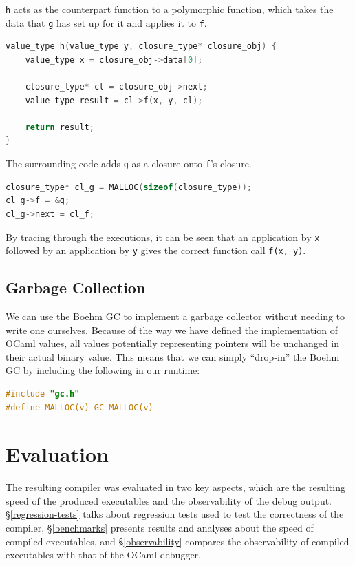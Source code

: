 \texttt{h} acts as the counterpart function to a polymorphic function, which 
takes the data that \texttt{g} has set up for it and applies it to \texttt{f}.

\begin{lstlisting}[language=C]
value_type h(value_type y, closure_type* closure_obj) {
    value_type x = closure_obj->data[0];
    
    closure_type* cl = closure_obj->next;
    value_type result = cl->f(x, y, cl);
    
    return result;
}
\end{lstlisting}

The surrounding code adds \texttt{g} as a closure onto \texttt{f}'s closure.

\begin{lstlisting}[language=C]
closure_type* cl_g = MALLOC(sizeof(closure_type));
cl_g->f = &g;
cl_g->next = cl_f;
\end{lstlisting}

By tracing through the executions, it can be seen that an application by 
\texttt{x} followed by an application by \texttt{y} gives the correct function 
call \texttt{f(x, y)}.

\section{Garbage Collection} \label{gc}

We can use the Boehm GC to implement a garbage collector without needing to
write one ourselves. Because of the way we have defined the implementation of
OCaml values, all values potentially representing pointers will be unchanged in
their actual binary value. This means that we can simply ``drop-in'' the Boehm
GC by including the following in our runtime:

\begin{lstlisting}[language=C]
#include "gc.h"
#define MALLOC(v) GC_MALLOC(v)
\end{lstlisting}

\chapter{Evaluation}

The resulting compiler was evaluated in two key aspects, which are the 
resulting speed of the produced executables and the observability of the debug 
output. \S\ref{regression-tests} talks about regression tests used to test the
correctness of the compiler, \S\ref{benchmarks} presents results and analyses
about the speed of compiled executables, and \S\ref{observability} compares the
observability of compiled executables with that of the OCaml debugger.

